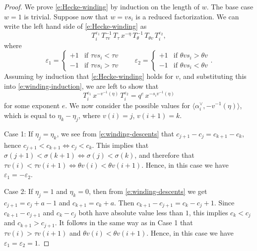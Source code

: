 \documentclass[12pt]{amsart}
\theoremstyle{definition}
\theoremstyle{remark}
\begin{document}
\begin{proof}
We prove \eqref{e:Hecke-winding} by induction on the length of $w$.
The base case $w=1$ is trivial.  Suppose now that $w = v s_{i}$ is a
reduced factorization.  We can write the left hand side of
\eqref{e:Hecke-winding} as
\begin{equation}\label{e:winding-induction}
T_{i}^{\varepsilon _{1}}\, T_{\tau v}^{-1}\, T_{\tau }\, x^{-\eta }\,
T_{\theta }^{-1}\, T_{\theta v}\, T_{i}^{\varepsilon _{2}},
\end{equation}
where
\begin{equation}\label{e:epsilons}
\varepsilon _{1} = \begin{cases}
+1 &	 \text{if $\tau vs_{i} < \tau  v$}\\
-1&	 \text{if $\tau vs_{i} > \tau  v$}
\end{cases}\qquad
\varepsilon _{2} = \begin{cases}
+1 &	 \text{if $\theta vs_{i} > \theta v$}\\
-1&	 \text{if $\theta vs_{i} < \theta v$}
\end{cases}.
\end{equation}
Assuming by induction that \eqref{e:Hecke-winding} holds for $v$, and
substituting this into \eqref{e:winding-induction}, we are left to
show that
\begin{equation}\label{e:TxT-special}
T_{i}^{\varepsilon _{1}}\, x^{-v^{-1}(\eta )}\, T_{i}^{\varepsilon _{2}} =
q^{e}\, x^{-s_{i} v^{-1}(\eta )}
\end{equation}
for some exponent $e$.  We now consider the possible values for
$\langle \alpha _{i}^{\vee }, -v^{-1}(\eta ) \rangle$, which is equal
to $\eta _{k}-\eta _{j}$, where $v(i) = j$, $v(i+1) = k$.

Case 1: If $\eta _{j} = \eta _{k}$, we see from \eqref{e:winding-descents}
that $c_{j+1}-c_{j} = c_{k+1}-c_{k}$, hence $c_{j+1} <
c_{k+1}\Leftrightarrow c_{j} < c_{k}$.  This implies that $\sigma
(j+1)<\sigma(k+1) \Leftrightarrow \sigma (j)<\sigma (k)$, and therefore that
$\tau v(i) < \tau v(i+1) \Leftrightarrow \theta v(i) < \theta v(i+1)$.
Hence, in this case we have $\varepsilon_{1} = -\varepsilon _{2}$.

Case 2: If $\eta _{j} = 1$ and $\eta _{k} = 0$, then from
\eqref{e:winding-descents} we get $c_{j+1} = c_{j}+a-1$ and $c_{k+1} =
c_{k}+a$.  Then $c_{k+1}-c_{j+1} = c_{k}-c_{j}+1$.  Since
$c_{k+1}-c_{j+1}$ and $c_{k}-c_{j}$ both have absolute value less than
$1$, this implies $c_{k} < c_{j}$ and $c_{k+1} > c_{j+1}$.  It follows
in the same way as in Case 1 that $\tau v(i) > \tau v(i+1)$ and
$\theta v(i) < \theta v(i+1)$.  Hence, in this case we have $\varepsilon
_{1} = \varepsilon _{2} = 1$.


\end{proof}
\end{document}
